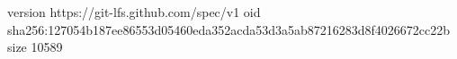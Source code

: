 version https://git-lfs.github.com/spec/v1
oid sha256:127054b187ee86553d05460eda352acda53d3a5ab87216283d8f4026672cc22b
size 10589
